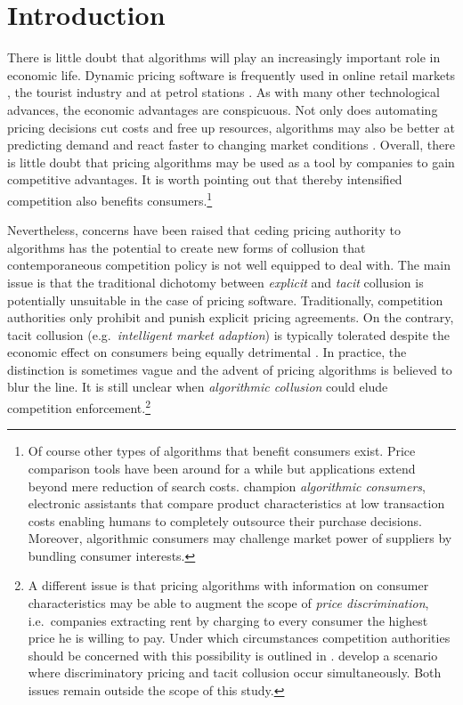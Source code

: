 \section{Introduction}

There is little doubt that algorithms will play an increasingly important role in economic life. Dynamic pricing software is frequently used in online retail markets \parencite{chen_empirical_2016}, the tourist industry \parencite[p.4]{den_boer_dynamic_2015} and at petrol stations \parencite[pp.7-9]{assad_algorithmic_2020}. As with many other technological advances, the economic advantages are conspicuous. Not only does automating pricing decisions cut costs and free up resources, algorithms may also be better at predicting demand and react faster to changing market conditions \parencite[p. 15]{oecd_algorithms_2017}. Overall, there is little doubt that pricing algorithms may be used as a tool by companies to gain competitive advantages. It is worth pointing out that thereby intensified competition also benefits consumers.\footnote{Of course other types of algorithms that benefit consumers exist. Price comparison tools have been around for a while but applications extend beyond mere reduction of search costs. \textcite{gal_algorithmic_2017} champion \emph{algorithmic consumers}, electronic assistants that compare product characteristics at low transaction costs enabling humans to completely outsource their purchase decisions. Moreover, algorithmic consumers may challenge market power of suppliers by bundling consumer interests.}

Nevertheless, concerns have been raised that ceding pricing authority to algorithms has the potential to create new forms of collusion that contemporaneous competition policy is not well equipped to deal with. The main issue is that the traditional dichotomy between \emph{explicit} and \emph{tacit} collusion is potentially unsuitable in the case of pricing software. Traditionally, competition authorities only prohibit and punish explicit pricing agreements. On the contrary, tacit collusion (e.g.\ \emph{intelligent market adaption}) is typically tolerated despite the economic effect on consumers being equally detrimental \parencite[p. 141]{motta_competition_2004}. In practice, the distinction is sometimes vague and the advent of pricing algorithms is believed to blur the line. It is still unclear when \emph{algorithmic collusion} could elude competition enforcement.\footnote{A different issue is that pricing algorithms with information on consumer characteristics may be able to augment the scope of \emph{price discrimination}, i.e.\ companies extracting rent by charging to every consumer the highest price he is willing to pay. Under which circumstances competition authorities should be concerned with this possibility is outlined in \textcite{oecd_price_2016}. \textcite{ezrachi_algorithmic_2017} develop a scenario where discriminatory pricing and tacit collusion occur simultaneously. Both issues remain outside the scope of this study.}

